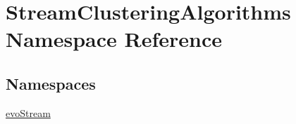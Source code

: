 \hypertarget{namespaceStreamClusteringAlgorithms}{}\section{Stream\+Clustering\+Algorithms Namespace Reference}
\label{namespaceStreamClusteringAlgorithms}
\subsection*{Namespaces}
\begin{DoxyCompactItemize}
\item 
 \hyperlink{namespaceStreamClusteringAlgorithms_1_1evoStream}{evo\+Stream}
\end{DoxyCompactItemize}
